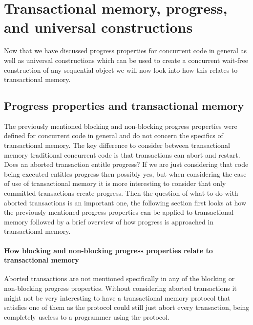 








\section{Transactional memory, progress, and universal constructions}
Now that we have discussed progress properties for
concurrent code in general as well as
universal constructions which can be used to create
a concurrent wait-free construction of any sequential object
we will now look into how this relates to transactional memory.

\subsection{Progress properties and transactional memory}

The previously mentioned blocking and non-blocking progress
properties were defined for concurrent code in general
and do not concern the specifics of transactional memory.
The key difference to consider between transactional memory traditional concurrent
code is that transactions can abort and restart.
Does an aborted transaction entitle progress?
If we are just considering that code being executed entitles
progress then possibly yes, but when considering the ease of use of transactional
memory it is more interesting to consider that only committed transactions
create progress.
Then the question of what to do with aborted transactions is an important one,
the following section first looks at how the previously mentioned progress
properties can be applied to transactional memory
followed by a brief overview of how progress is approached in transactional
memory.

\paragraph{How blocking and non-blocking progress properties relate to transactional memory}
Aborted transactions are not mentioned specifically in any of the blocking
or non-blocking progress properties.
Without considering aborted transactions it might not be very interesting
to have a transactional memory protocol that satisfies one of them
as the protocol could still just abort every transaction, being completely
useless to a programmer using the protocol.

